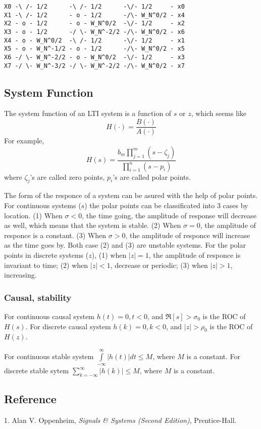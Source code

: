 {\footnotesize%
\begin{verbatim}
X0 -\ /- 1/2      -\ /- 1/2      -\/- 1/2     - x0
X1 -\ /- 1/2      - o - 1/2      -/\- W_N^0/2 - x4
X2 - o - 1/2      - o - W_N^0/2  -\/- 1/2     - x2
X3 - o - 1/2      -/ \- W_N^-2/2 -/\- W_N^0/2 - x6
X4 - o - W_N^0/2  -\ /- 1/2      -\/- 1/2     - x1
X5 - o - W_N^-1/2 - o - 1/2      -/\- W_N^0/2 - x5
X6 -/ \- W_N^-2/2 - o - W_N^0/2  -\/- 1/2     - x3
X7 -/ \- W_N^-3/2 -/ \- W_N^-2/2 -/\- W_N^0/2 - x7
\end{verbatim}
}



\subsection{System Function}

 The system function of an LTI system is a function of $s$ or $z$, which seems like
 \[ H(\cdot) = \frac{B(\cdot)}{A(\cdot)} \] 
 For example,
 \[H(s) = \frac{b_m \prod_{j=1}^m (s - \zeta_j)}{\prod_{i=1}^n (s - p_i)} \]
 where $\zeta_j$'s are called zero points, $p_i$'s are called polar points.

 The form of the responce of a system can be asured with the help of polar points.
 For continuous systems ($s$) the polar points can be classificated into 3 cases by location.
 (1) When $\sigma < 0$, the time going, the amplitude of response will decrease as well,
 which means that the system is stable.
 (2) When $\sigma = 0$, the amplitude of responce is a constant.
 (3) When $\sigma > 0$, the amplitude of responce will increase as the time goes by.
 Both case (2) and (3) are unstable systems.
 For the polar points in discrete systems ($z$), (1) when $|z|=1$, the amplitude of
 responce is invariant to time; (2) when $|z| < 1$, decrease or periodic; (3) when $|z|>1$,
 increasing.

 \subsubsection{Causal, stability}
 
 For continuous causal system $h(t) = 0 , t < 0$, and $\Re[s]>\sigma_0$ is the ROC of $H(s)$.
 For discrete causal system $h(k)=0, k<0$, and $|z|>\rho_0$ is the ROC of $H(z)$.

 For continuous stable system $\int\limits_{-\infty}^\infty |h(t)|dt \leqslant M$, where $M$ is a
 constant. For discrete stable sytem $\sum\limits_{k=-\infty}^\infty |h(k)|\leqslant M$, where
 $M$ is a constant.

\subsection{Reference}

 1. Alan V. Oppenheim, {\it Signals \& Systems (Second Edition)}, Prentice-Hall.
